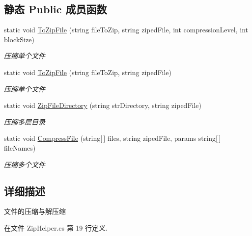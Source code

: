 \subsection*{静态 Public 成员函数}
\begin{DoxyCompactItemize}
\item 
static void \hyperlink{class_x_c_l_net_tools_1_1_file_handler_1_1_zip_helper_a4437b013f4b0db430cb1fd6097ed54a1}{To\-Zip\-File} (string file\-To\-Zip, string ziped\-File, int compression\-Level, int block\-Size)
\begin{DoxyCompactList}\small\item\em 压缩单个文件 \end{DoxyCompactList}\item 
static void \hyperlink{class_x_c_l_net_tools_1_1_file_handler_1_1_zip_helper_ab59c063455118d1eedb3a1af719db063}{To\-Zip\-File} (string file\-To\-Zip, string ziped\-File)
\begin{DoxyCompactList}\small\item\em 压缩单个文件 \end{DoxyCompactList}\item 
static void \hyperlink{class_x_c_l_net_tools_1_1_file_handler_1_1_zip_helper_a1231101acec5d274c2770115d1584ae3}{Zip\-File\-Directory} (string str\-Directory, string ziped\-File)
\begin{DoxyCompactList}\small\item\em 压缩多层目录 \end{DoxyCompactList}\item 
static void \hyperlink{class_x_c_l_net_tools_1_1_file_handler_1_1_zip_helper_abd0e8402a3d1ea9ca9f6c97cb46d5b89}{Compress\-File} (string\mbox{[}$\,$\mbox{]} files, string ziped\-File, params string\mbox{[}$\,$\mbox{]} file\-Names)
\begin{DoxyCompactList}\small\item\em 压缩多个文件 \end{DoxyCompactList}\end{DoxyCompactItemize}


\subsection{详细描述}
文件的压缩与解压缩 



在文件 Zip\-Helper.\-cs 第 19 行定义.



